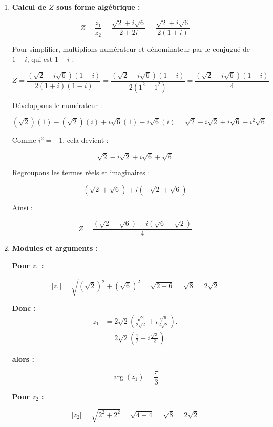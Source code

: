 \documentclass[a4paper,12pt]{article}
\begin{document}
\begin{solutionbox}
\begin{enumerate}
    \item \textbf{Calcul de \( Z \) sous forme algébrique :}

    \[
    Z = \dfrac{z_1}{z_2} = \dfrac{\sqrt{2} + i\sqrt{6}}{2 + 2i} = \dfrac{\sqrt{2} + i\sqrt{6}}{2(1 + i)}
    \]
    
    Pour simplifier, multiplions numérateur et dénominateur par le conjugué de \( 1 + i \), qui est \( 1 - i \) :
    
    \[
    Z = \dfrac{(\sqrt{2} + i\sqrt{6})(1 - i)}{2(1 + i)(1 - i)} = \dfrac{(\sqrt{2} + i\sqrt{6})(1 - i)}{2(1^2 + 1^2)} = \dfrac{(\sqrt{2} + i\sqrt{6})(1 - i)}{4}
    \]
    
    Développons le numérateur :
    
    \[
    (\sqrt{2})(1) - (\sqrt{2})(i) + i\sqrt{6}(1) - i\sqrt{6}(i) = \sqrt{2} - i\sqrt{2} + i\sqrt{6} - i^2 \sqrt{6}
    \]
    
    Comme \( i^2 = -1 \), cela devient :
    
    \[
    \sqrt{2} - i\sqrt{2} + i\sqrt{6} + \sqrt{6}
    \]
    
    Regroupons les termes réels et imaginaires :
    
    \[
    (\sqrt{2} + \sqrt{6}) + i(-\sqrt{2} + \sqrt{6})
    \]
    
    Ainsi :
    
    \[
    Z = \dfrac{ (\sqrt{2} + \sqrt{6}) + i(\sqrt{6} - \sqrt{2}) }{4}
    \]
    
    \item \textbf{Modules et arguments :}

    \textbf{Pour \( z_1 \) :}

    \[
    |z_1| = \sqrt{ (\sqrt{2})^2 + (\sqrt{6})^2 } = \sqrt{2 + 6} = \sqrt{8} = 2\sqrt{2}
    \]

    \textbf{Donc :}
    \begin{align*}
    z_1 &= 2\sqrt{2} \left( \frac{\sqrt{2}}{2\sqrt{2}} + i \frac{\sqrt{6}}{2\sqrt{2}} \right).\\
    &= 2\sqrt{2} \left( \frac{1}{2} + i \frac{\sqrt{3}}{2} \right).
    \end{align*}
    
    \textbf{alors :}
    
    \[
    \arg(z_1) = \dfrac{\pi}{3}
    \]
    
    \textbf{Pour \( z_2 \) :}

    \[
    |z_2| = \sqrt{ 2^2 + 2^2 } = \sqrt{4 + 4} = \sqrt{8} = 2\sqrt{2}
    \]


\end{enumerate}
\end{solutionbox}
\end{document}
